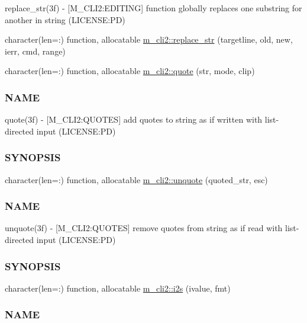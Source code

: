 \begin{DoxyCompactItemize}
\begin{DoxyCompactList}
replace\+\_\+str(3f) -\/ \mbox{[}M\+\_\+\+C\+L\+I2\+:E\+D\+I\+T\+I\+NG\mbox{]} function globally replaces one substring for another in string (L\+I\+C\+E\+N\+SE\+:PD) \end{DoxyCompactList}\item 
character(len=\+:) function, allocatable \mbox{\hyperlink{namespacem__cli2_a8f65cf1b227d837d89437368c660666f}{m\+\_\+cli2\+::replace\+\_\+str}} (targetline, old, new, ierr, cmd, range)
\item 
character(len=\+:) function, allocatable \mbox{\hyperlink{namespacem__cli2_a63f81a2c027eb5f3e0a77167ac29fc73}{m\+\_\+cli2\+::quote}} (str, mode, clip)
\begin{DoxyCompactList}\small\item\em \subsubsection*{N\+A\+ME}

quote(3f) -\/ \mbox{[}M\+\_\+\+C\+L\+I2\+:Q\+U\+O\+T\+ES\mbox{]} add quotes to string as if written with list-\/directed input (L\+I\+C\+E\+N\+SE\+:PD) \subsubsection*{S\+Y\+N\+O\+P\+S\+IS}\end{DoxyCompactList}\item 
character(len=\+:) function, allocatable \mbox{\hyperlink{namespacem__cli2_a9cab7352414f8b5625330a9ff5cf0cb4}{m\+\_\+cli2\+::unquote}} (quoted\+\_\+str, esc)
\begin{DoxyCompactList}\small\item\em \subsubsection*{N\+A\+ME}

unquote(3f) -\/ \mbox{[}M\+\_\+\+C\+L\+I2\+:Q\+U\+O\+T\+ES\mbox{]} remove quotes from string as if read with list-\/directed input (L\+I\+C\+E\+N\+SE\+:PD) \subsubsection*{S\+Y\+N\+O\+P\+S\+IS}\end{DoxyCompactList}\item 
character(len=\+:) function, allocatable \mbox{\hyperlink{namespacem__cli2_aa106d3533fd6d4845f0b3e94b2a79ffb}{m\+\_\+cli2\+::i2s}} (ivalue, fmt)
\begin{DoxyCompactList}\small\item\em \subsubsection*{N\+A\+ME}


\end{DoxyCompactList}
\end{DoxyCompactItemize}
